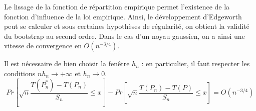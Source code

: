 \documentclass{article}
\renewcommand*{\(}{ \left( }
\renewcommand*{\)}{ \right) }
\begin{document}
Le lissage de la fonction de répartition empirique permet l'existence de la fonction d'influence de la loi empirique. Ainsi, le développement d'Edgeworth peut se calculer et sous certaines hypothèses de régularité, on obtient la validité du bootstrap au second ordre. Dans le cas d'un noyau gaussien, on a ainsi une vitesse de convergence en $O(n^{-3/4})$.

Il est nécessaire de bien choisir la fenêtre $h_n$ : en particulier, il faut respecter les conditions 
$nh_n \rightarrow +\infty$ et $h_n \rightarrow 0$.\\

\begin{equation*}
Pr\left[ \sqrt{n}\frac{T(P^*_n)-T(P_n)}{S_n} \leq x\right]-Pr\left[\sqrt{n}\frac{T(P_n)-T(P)}{S_n} \leq x \right]=O\(n^{-3/4}\)
\end{equation*}
\end{document}
